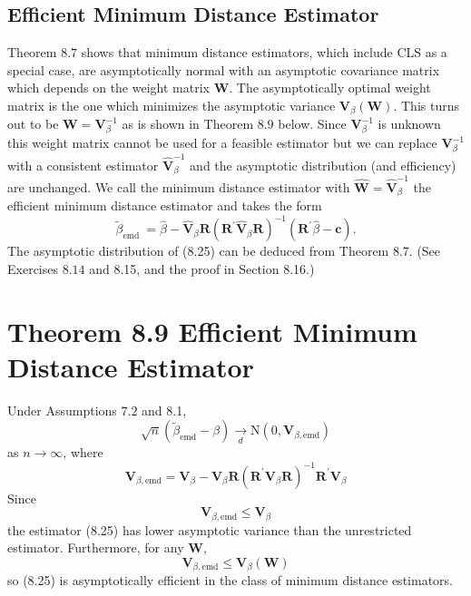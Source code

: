 \documentclass[10pt]{article}
\begin{document}
\subsection{Efficient Minimum Distance Estimator}
Theorem $8.7$ shows that minimum distance estimators, which include CLS as a special case, are asymptotically normal with an asymptotic covariance matrix which depends on the weight matrix $\boldsymbol{W}$. The asymptotically optimal weight matrix is the one which minimizes the asymptotic variance $\boldsymbol{V}_{\beta}(\boldsymbol{W})$. This turns out to be $\boldsymbol{W}=\boldsymbol{V}_{\beta}^{-1}$ as is shown in Theorem $8.9$ below. Since $\boldsymbol{V}_{\beta}^{-1}$ is unknown this weight matrix cannot be used for a feasible estimator but we can replace $\boldsymbol{V}_{\beta}^{-1}$ with a consistent estimator $\widehat{\boldsymbol{V}}_{\beta}^{-1}$ and the asymptotic distribution (and efficiency) are unchanged. We call the minimum distance estimator with $\widehat{\boldsymbol{W}}=\widehat{\boldsymbol{V}}_{\beta}^{-1}$ the efficient minimum distance estimator and takes the form
$$
\widetilde{\beta}_{\text {emd }}=\widehat{\beta}-\widehat{\boldsymbol{V}}_{\beta} \boldsymbol{R}\left(\boldsymbol{R}^{\prime} \widehat{\boldsymbol{V}}_{\beta} \boldsymbol{R}\right)^{-1}\left(\boldsymbol{R}^{\prime} \widehat{\beta}-\boldsymbol{c}\right) .
$$
The asymptotic distribution of (8.25) can be deduced from Theorem 8.7. (See Exercises $8.14$ and 8.15, and the proof in Section 8.16.)

\section{Theorem 8.9 Efficient Minimum Distance Estimator}
Under Assumptions $7.2$ and 8.1,
$$
\sqrt{n}\left(\widetilde{\beta}_{\mathrm{emd}}-\beta\right) \underset{d}{\longrightarrow} \mathrm{N}\left(0, \boldsymbol{V}_{\beta, \mathrm{emd}}\right)
$$
as $n \rightarrow \infty$, where
$$
\boldsymbol{V}_{\beta, \mathrm{emd}}=\boldsymbol{V}_{\beta}-\boldsymbol{V}_{\beta} \boldsymbol{R}\left(\boldsymbol{R}^{\prime} \boldsymbol{V}_{\beta} \boldsymbol{R}\right)^{-1} \boldsymbol{R}^{\prime} \boldsymbol{V}_{\beta}
$$
Since
$$
\boldsymbol{V}_{\beta, \mathrm{emd}} \leq \boldsymbol{V}_{\beta}
$$
the estimator (8.25) has lower asymptotic variance than the unrestricted estimator. Furthermore, for any $\boldsymbol{W}$,
$$
\boldsymbol{V}_{\beta, \mathrm{emd}} \leq \boldsymbol{V}_{\beta}(\boldsymbol{W})
$$
so (8.25) is asymptotically efficient in the class of minimum distance estimators.
\end{document}
